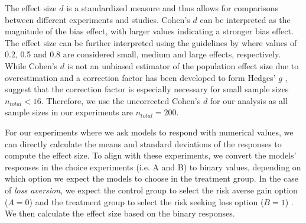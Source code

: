 \par The effect size $d$ is a standardized measure and thus allows for comparisons between different experiments and studies. Cohen's $d$ can be interpreted as the magnitude of the bias effect, with larger values indicating a stronger bias effect. The effect size can be further interpreted using the guidelines by \textcite{cohen1988statistical} where values of 0.2, 0.5 and 0.8 are considered small, medium and large effects, respectively. While Cohen's $d$ is not an unbiased estimator of the population effect size due to overestimation and a correction factor has been developed to form Hedges' $g$ \parencite{hedges1981distribution}, \textcite{goulet2018review} suggest that the correction factor is especially necessary for small sample sizes $n_{total} < 16$. Therefore, we use the uncorrected Cohen's $d$ for our analysis as all sample sizes in our experiments are $n_{total} = 200$.

\par For our experiments where we ask models to respond with numerical values, we can directly calculate the means and standard deviations of the responses to compute the effect size. To align with these experiments, we convert the models' responses in the choice experiments (i.e. A and B) to binary values, depending on which option we expect the models to choose in the treatment group. In the case of \textit{loss aversion}, we expect the control group to select the risk averse gain option ($A=0$) and the treatment group to select the risk seeking loss option ($B=1$) \parencite{thaler2015misbehaving}. We then calculate the effect size based on the binary responses.

